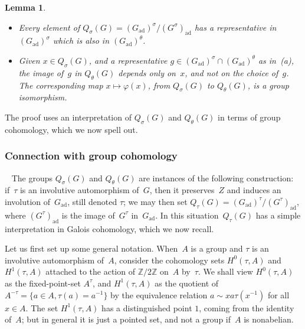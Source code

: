 \documentclass[cupthm]{CUP-JNL-JMJ}
\numberwithin{equation}{section}
\theoremstyle{cupplain}
\newtheorem{lemma}[theorem]{Lemma}
\theoremstyle{cupdefinition}
\theoremstyle{cupremark}
\theoremstyle{cupproof}
\newcommand{\ad}{\mathrm{ad}}
\newcommand{\Gad}{G_\mathrm{ad}}
\newcommand{\Z}{\mathbb Z}
\begin{document}
\begin{lemma}\label{lem:iso_q}~
\begin{itemize}
\item[(a)] 
Every element of $Q_\sigma(G)=(\Gad)^\sigma/(G^\sigma)_\ad$ has a representative in $(\Gad)^\sigma$ which is also in $(\Gad)^\theta$.
\item[(b)] Given $x \in Q_{\sigma}(G)$, and a representative $g\in (\Gad)^\sigma \cap (\Gad)^\theta$ as in~(a), the image of~$g$ in  $Q_\theta(G)$ depends only on~$x$, and not on  the choice of~$g$. The corresponding map $x \mapsto \varphi(x)$, from $Q_{\sigma}(G)$ to $Q_{\theta}(G)$, is a group isomorphism. 
\end{itemize}
\end{lemma}


The proof uses an interpretation of $Q_\sigma(G)$ and $Q_\theta(G)$ in terms of group cohomology, which we now spell out. 

\subsubsection{Connection with group cohomology}~
The groups $Q_{\sigma}(G)$ and $Q_{\theta}(G)$ are instances of the following construction: if~$\tau$ is an involutive automorphism of~$G$, then it preserves~$Z$ and induces an involution of~$\Gad$, still denoted $\tau$; we may then set $Q_{\tau}(G)=(\Gad)^{\tau}/(G^{\tau})_{\ad}$, where $(G^{\tau})_{\ad}$ is the image of~$G^{\tau}$ in~$\Gad$. In this situation~$Q_{\tau}(G)$ has a simple interpretation in Galois cohomology, which we now recall. 

Let us first set up some general notation. When~$A$ is a group and $\tau$ is an involutive automorphism of~$A$, consider the cohomology sets $H^0(\tau, A)$ and $H^1(\tau, A)$ attached to the action of $\Z/2\Z$ on~$A$ by~$\tau$. We shall view   $H^0(\tau, A)$ as the fixed-point-set $A^{\tau}$, and $H^1(\tau,A)$ as the quotient of \mbox{$A^{-\tau} = \{ a \in A, \tau(a)=a^{-1}\}$} by the equivalence relation $a \sim x a \tau(x^{-1})$ for all $x \in A$. The set $H^1(\tau, A)$ has a distinguished point $1$, coming from the identity of~$A$; but in general it is just a pointed set, and not a group if~$A$ is nonabelian. 
\end{document}
